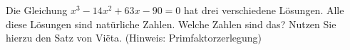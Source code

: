 \item  Die Gleichung $x^3-14x^2+63x-90=0$ hat drei verschiedene Lösungen. Alle diese Lösungen sind natürliche Zahlen. Welche Zahlen sind das? Nutzen Sie hierzu den Satz von Vi\"{e}ta. (Hinweis: Primfaktorzerlegung)

